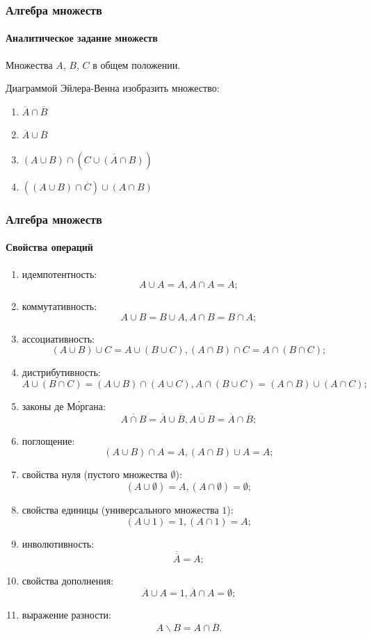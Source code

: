 \begin{frame}
    \frametitle{Алгебра множеств}
    \framesubtitle{Аналитическое задание множеств}
    
    Множества $A$, $B$, $C$ в общем положении. 
    
    Диаграммой Эйлера-Венна изобразить множество:
    \begin{enumerate}
        \item $\overline{A}\cap\overline{B}$
        \item $\overline{A}\cup\overline{B}$
        \item $(A\cup B)\cap(\overline{C\cup (A\cap B)})$
        \item $((A\cup B)\cap\overline{C})\cup(A\cap B)$
    \end{enumerate}
\end{frame}

\begin{frame}[allowframebreaks]
    \frametitle{Алгебра множеств}
    \framesubtitle{Свойства операций}
    
    \begin{enumerate}
        \item идемпотентность:
        \[A\cup A=A, A\cap A=A;\]
        
        \item коммутативность:
        \[A\cup B=B\cup A, A\cap B=B\cap A;\]
        
        \item ассоциативность:
        \[(A\cup B)\cup C=A\cup(B\cup C), (A\cap B)\cap C=A\cap(B\cap C);\]
        
        \item дистрибутивность:
        \[A\cup(B\cap C)=(A\cup B)\cap(A\cup C),A\cap(B\cup C)=(A\cap B)\cup(A\cap C);\]
        
        \item законы де М\'{о}ргана:
        \[
            \overline{A\cap B}=\overline{A}\cup\overline{B},
            \overline{A\cup B}=\overline{A}\cap\overline{B};
        \]
        
        \item поглощение:
        \[(A\cup B)\cap A=A,(A\cap B)\cup A=A;\]
        
        \item свойства нуля (пустого множества $\emptyset$):
        \[(A\cup \emptyset)=A,(A\cap \emptyset)=\emptyset;\]
        
        \item свойства единицы (универсального множества $1$):
        \[(A\cup 1)=1,(A\cap 1)=A;\]
        
        \item инволютивность:
        \[\overline{\overline{A}}=A;\]
            
        \item свойства дополнения:
        \[
            \overline{A}\cup A=1,
            \overline{A}\cap A=\emptyset;
        \]
        
        \item выражение разности:
        \[
            A\backslash B=A\cap\overline{B}.
        \]
    \end{enumerate}
\end{frame}

